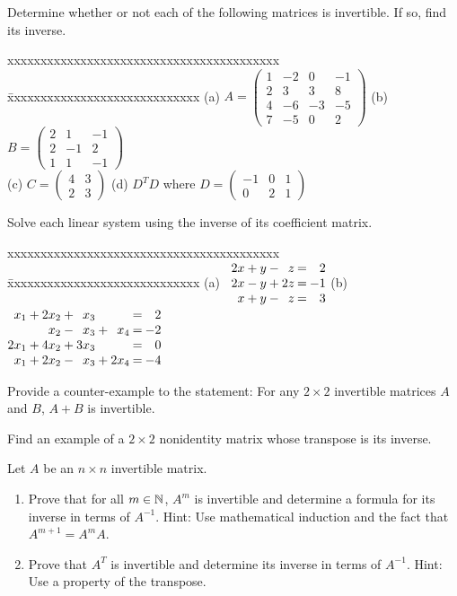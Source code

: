 \documentclass[12pt]{article}
\makeatletter
\def\it{\item}
\def\be{\begin{enumerate}} \def\ee{\end{enumerate}}
\def\lp{\left(} \def\rp{\right)} \def\abs#1{\vert #1 \vert}
\def\btt{\begin{tabbing}
xxxxxxxxxxxxxxxxxxxxxxxxxxxxxxxxxxxxxxxxx \=
xxxxxxxxxxxxxxxxxxxxxxxxxxxxx \kill}
\def\etb{\end{tabbing}}
\newenvironment{linsys}[2][m]{%
\setlength{\arraycolsep}{.1111em} %
\begin{array}[#1]{@{}*{#2}{rc}r@{}} 
}{%
\end{array}}
\makeatother
\begin{document}
\it Determine whether or not each of the following matrices is invertible.
	If so, find its inverse. 
	\btt
	(a) $A = \lp \begin{array}{rrrr} 
		1 & -2 & 0 & -1 \\ 
		2 & 3 & 3 & 8 \\ 
		4 & -6 & -3 & -5 \\ 
		7 & -5 & 0 & 2 \end{array} \rp$ \>
	(b) $B = \lp \begin{array}{rrr} 
		2 & 1 & -1 \\ 2 & -1 & 2 \\ 
		1 & 1 & -1 \end{array} \rp$ \\[.05in]
	(c) $C = \lp \begin{array}{rr} 4 & 3 \\ 2 & 3 \end{array} \rp$ \>
	(d) $D^T D$ where $D = \lp \begin{array}{rrr} -1 & 0 & 1 \\ 0 & 2 & 1 		
		\end{array} \rp$
	\etb

\newpage

\it Solve each linear system using the inverse of its coefficient matrix.
	\btt
	(a) \
	$\begin{linsys}{3}
	2x &+ &y &- &z  &= &2 \\
	2x &- &y &+ &2z &= &-1 \\
	 x &+ &y &- &z  &= &3
	\end{linsys}$ \>
	(b) \
	$\begin{linsys}{4}
	x_1  &+ &2x_2 &+ &x_3  &\ &\    &= &2 \\
	\    &\ &x_2  &- &x_3  &+ &x_4  &= &-2 \\
	2x_1 &+ &4x_2 &+ &3x_3 &\ &\    &= &0 \\
	x_1  &+ &2x_2 &- &x_3  &+ &2x_4 &= &-4
	\end{linsys}$
	\etb
	
\it Provide a counter-example to the statement: For any $2 \times 2$ invertible
	matrices $A$ and $B$, $A + B$ is invertible.

\it Find an example of a $2 \times 2$ nonidentity matrix whose transpose is its
	inverse.

\it Let $A$ be an $n \times n$ invertible matrix.
	\be
	\it Prove that for all $m \in \mathbb{N}$, $A^m$ is invertible and determine a
		formula for its inverse in terms of $A^{-1}$. Hint: Use mathematical induction and the fact that $A^{m+1} = A^m A$.
	\it Prove that $A^T$ is invertible and determine its inverse in terms of
		$A^{-1}$. Hint: Use a property of the transpose.
	\ee
\end{document}
